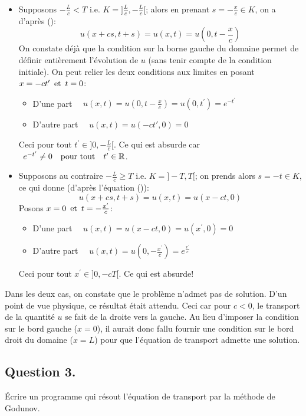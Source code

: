 \documentclass[
	french,
	11pt, %
]{fphw}
\newcommand{\hquad}{\hspace{0.5em}} %
\begin{document}
\begin{itemize}[label=$\blacksquare$]
	\item  Supposons $-\frac{L}{c} < T \,\, \text{i.e.} \,\, K = ]\frac{L}{c}, -\frac{L}{c}[$; alors en prenant $s=-\frac{x}{c} \in K$, on a d'après ():
	$$u(x+cs, t+s) = u(x, t) = u(0, t-\frac{x}{c})$$ 
	On constate déjà que la condition sur la borne gauche du domaine permet de définir entièrement l'évolution de $u$ (sans tenir compte de la condition initiale). 
	On peut relier les deux conditions aux limites en posant $x=-ct^\prime \hquad \text{et} \hquad t=0 $:
	\begin{itemize}
		\item D'une part $\quad u(x,t) = u(0, t-\frac{x}{c}) = u(0, t^\prime) = e^{-t^\prime}$
		\item D'autre part $\quad u(x,t) = u(-ct', 0) = 0$
	\end{itemize}
	Ceci pour tout $t^\prime \in ]0,-\frac{L}{c}[ $. Ce qui est absurde car $\hquad e^{-t^\prime} \neq 0 \quad \text{pour tout} \quad t^\prime \in \mathbb{R}$.

	\item Supposons au contraire $-\frac{L}{c} \geq T \,\, \text{i.e.} \,\, K = ]-T, T[$; on prends alors $s=-t \in K$, ce qui donne (d'après l'équation ()): 
	$$u(x+cs, t+s) = u(x, t) = u(x-ct, 0)$$
	Posons $x=0 \hquad \text{et} \hquad t=-\frac{x^\prime}{c} $:
	\begin{itemize}
		\item D'une part $\quad u(x, t) = u(x-ct, 0) = u(x^\prime, 0) = 0$
		\item D'autre part $\quad u(x,t) = u(0, -\frac{x^\prime}{c}) = e^{\frac{x^\prime}{c}}$
	\end{itemize}
	Ceci pour tout $x^\prime \in ]0,-cT[$. Ce qui est absurde!
\end{itemize}
Dans les deux cas, on constate que le problème n'admet pas de solution. D'un point de vue physique, ce résultat était attendu. Ceci car pour $c<0$, le transport de la quantité $u$ se fait de la droite vers la gauche. Au lieu d'imposer la condition sur le bord gauche ($x=0$), il aurait donc fallu fournir une condition sur le bord droit du domaine ($x=L$) pour que l'équation de transport admette une solution.



\subsection*{Question 3.}
\begin{problem}
	Écrire un programme qui résout l'équation de transport par la méthode de Godunov.
\end{problem}
\end{document}
